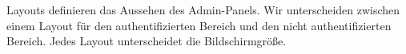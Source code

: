 Layouts definieren das Aussehen des Admin-Panels.
Wir unterscheiden zwischen einem Layout für den authentifizierten Bereich und den nicht authentifizierten Bereich.
Jedes Layout unterscheidet die Bildschirmgröße.